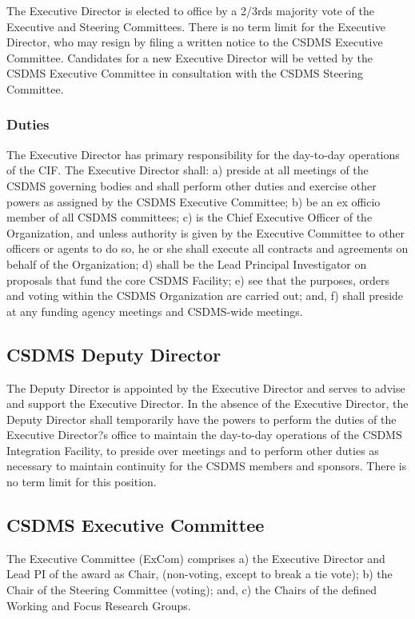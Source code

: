 \documentclass[11pt, oneside]{article}   	%
\begin{document}
The Executive Director is elected to office by a 2/3rds majority vote of the Executive and Steering Committees.  There is no term limit for the Executive Director, who may resign by filing a written notice to the CSDMS Executive Committee.  Candidates for a new Executive Director will be vetted by the CSDMS Executive Committee in consultation with the CSDMS Steering Committee.  

\subsubsection{Duties}

The Executive Director has primary responsibility for the day-to-day operations of the CIF.  The Executive Director shall: a) preside at all meetings of the CSDMS governing bodies and shall perform other duties and exercise other powers as assigned by the CSDMS Executive Committee; b) be an ex officio member of all CSDMS committees; c) is the Chief Executive Officer of the Organization, and unless authority is given by the Executive Committee to other officers or agents to do so, he or she shall execute all contracts and agreements on behalf of the Organization; d) shall be the Lead Principal Investigator on proposals that fund the core CSDMS Facility; e) see that the purposes, orders and voting within the CSDMS Organization are carried out; and, f) shall preside at any funding agency meetings and CSDMS-wide meetings.
  
\subsection{CSDMS Deputy Director}

The Deputy Director is appointed by the Executive Director and serves to advise and support the Executive Director.  In the absence of the Executive Director, the Deputy Director shall temporarily have the powers to perform the duties of the Executive Director?s office to maintain the day-to-day operations of the CSDMS Integration Facility, to preside over meetings and to perform other duties as necessary to maintain continuity for the CSDMS members and sponsors.  There is no term limit for this position.

\subsection{CSDMS Executive Committee}

The Executive Committee (ExCom) comprises a) the Executive Director and Lead PI of the award as Chair, (non-voting, except to break a tie vote); b) the Chair of the Steering Committee (voting); and, c) the Chairs of the defined Working and Focus Research Groups.
 
\end{document}
